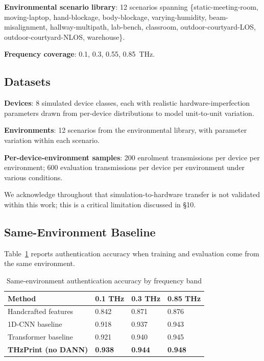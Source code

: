 \documentclass[sigconf,nonacm]{acmart}
\begin{document}
\textbf{Environmental scenario library}: 12 scenarios spanning
\{static-meeting-room, moving-laptop, hand-blockage, body-blockage,
varying-humidity, beam-misalignment, hallway-multipath, lab-bench,
classroom, outdoor-courtyard-LOS, outdoor-courtyard-NLOS,
warehouse\}.

\textbf{Frequency coverage}: 0.1, 0.3, 0.55, 0.85~THz.

\subsection{Datasets}

\textbf{Devices}: 8 simulated device classes, each with realistic
hardware-imperfection parameters drawn from per-device
distributions to model unit-to-unit variation.

\textbf{Environments}: 12 scenarios from the environmental
library, with parameter variation within each scenario.

\textbf{Per-device-environment samples}: 200 enrolment transmissions
per device per environment; 600 evaluation transmissions per
device per environment under various conditions.

We acknowledge throughout that simulation-to-hardware transfer is
not validated within this work; this is a critical limitation
discussed in §10.

\subsection{Same-Environment Baseline}

Table~\ref{tab:samenv} reports authentication accuracy when training
and evaluation come from the same environment.

\begin{table}[h]
\caption{Same-environment authentication accuracy by frequency band}
\label{tab:samenv}
\small
\begin{tabularx}{\columnwidth}{@{}p{2.6cm}X X X@{}}
\toprule
\textbf{Method} & \textbf{0.1 THz} & \textbf{0.3 THz} & \textbf{0.85 THz} \\
\midrule
Handcrafted features & 0.842 & 0.871 & 0.876 \\
1D-CNN baseline      & 0.918 & 0.937 & 0.943 \\
Transformer baseline & 0.921 & 0.940 & 0.945 \\
\textbf{THzPrint (no DANN)} & \textbf{0.938} & \textbf{0.944} & \textbf{0.948} \\
\bottomrule
\end{tabularx}
\end{table}
\end{document}
